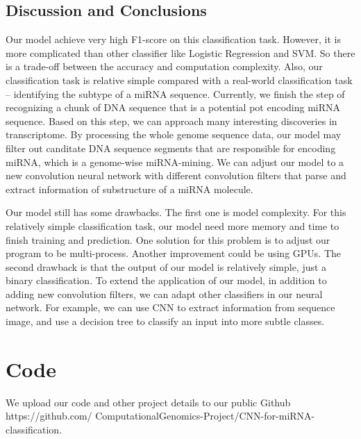 \documentclass[letterpaper, 11pt]{article}
\begin{document}
\begin{multicols*}{2}
{\subsection{Discussion and Conclusions}
Our model achieve very high F1-score on this classification task. However, it is more complicated than other classifier like Logistic Regression and SVM. So there is a trade-off between the accuracy and computation complexity. Also, our classification task is relative simple compared with a real-world classification task -- identifying the subtype of a miRNA sequence. Currently, we finish the step of recognizing a chunk of DNA sequence that is a potential pot encoding miRNA sequence. Based on this step, we can approach many interesting discoveries in transcriptome. By processing the whole genome sequence data, our model may filter out canditate DNA sequence segments that are responsible for encoding miRNA, which is a genome-wise miRNA-mining. We can adjust our model to a new convolution neural network with different convolution filters that parse and extract information of substructure of a miRNA molecule.

Our model still has some drawbacks. The first one is model complexity. For this relatively simple classification task, our model need more memory and time to finish training and prediction. One solution for this problem is to adjust our program to be multi-process. Another improvement could be using GPUs. The second drawback is that the output of our model is relatively simple, just a binary classification. To extend the application of our model, in addition to adding new convolution filters, we can adapt other classifiers in our neural network. For example, we can use CNN to extract information from sequence image, and use a decision tree to classify an input into more subtle classes.
}

\section{Code}
We upload our code and other project details to our public Github https://github.com/
ComputationalGenomics-Project/CNN-for-miRNA-classification.
\end{multicols*}
\end{document}
